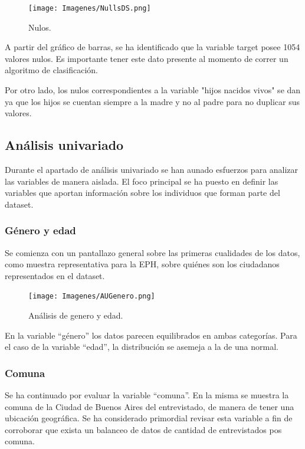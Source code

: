 \documentclass[a4paper]{article}
\begin{document}
    \begin{figure}[H]
        \centering
        \texttt{[image: Imagenes/NullsDS.png]}
        \caption{Nulos.}
        \label{nulls}
    \end{figure}
 
    A partir del gráfico de barras, se ha identificado que la variable target posee 1054 valores nulos. Es importante tener este dato presente al momento de correr un algoritmo de clasificación.

    Por otro lado, los nulos correspondientes a la variable "hijos nacidos vivos" se dan ya que los hijos se cuentan siempre a la madre y no al padre para no duplicar sus valores.

    \subsection{Análisis univariado}

    Durante el apartado de análisis univariado se han aunado esfuerzos para analizar las variables de manera aislada. El foco principal se ha puesto en definir las variables que aportan información sobre los individuos que forman parte del dataset.
        \subsubsection{Género y edad}
           
            Se comienza con un pantallazo general sobre las primeras cualidades de los datos, como muestra representativa para la EPH, sobre quiénes son los ciudadanos representados en el dataset.
           
            \begin{figure}[H]
                \centering
                \texttt{[image: Imagenes/AUGenero.png]}
                \caption{Análisis de genero y edad.}
                \label{AU genre and age}
            \end{figure}
            
            En la variable ``género'' los datos parecen equilibrados en ambas categorías. Para el caso de la variable ``edad'', la distribución se asemeja a la de una normal.
           
            \subsubsection{Comuna}
           
            Se ha continuado por evaluar la variable ``comuna''. En la misma se muestra la comuna de la Ciudad de Buenos Aires del entrevistado, de manera de tener una ubicación geográfica. Se ha considerado primordial revisar esta variable a fin de corroborar que exista un balanceo de datos de cantidad de entrevistados pos comuna.
           
\end{document}
